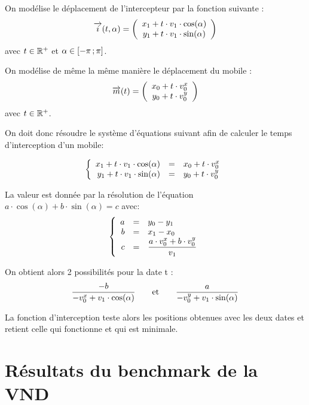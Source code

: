 	On modélise le déplacement de l'intercepteur par la fonction suivante : 
	\[
	\overrightarrow{i}(t,\alpha) = 
	\left(
	\begin{array}{c}
	 x_1 + t \cdot v_1 \cdot \cos(\alpha)\\
	 y_1 + t \cdot v_1 \cdot \sin(\alpha)
	\end{array}
	\right)
	\]
	avec $t \in \mathbb{R}^+$ et $\alpha \in \mathopen{[}-\pi\mathclose{}\mathpunct{};\pi\mathclose{]}$.

	On modélise de même la même manière le déplacement du mobile :
	\[
	\overrightarrow{m}(t) = 
	\left(
	\begin{array}{c}
	 x_0 + t \cdot v^{x}_0\\
	 y_0 + t \cdot v^{y}_0
	\end{array}
	\right)
	\]
	avec $t \in \mathbb{R}^+$.

	On doit donc résoudre le système d'équations suivant afin de calculer le temps d'interception d'un mobile:

	\[
	\left\{
	\begin{array}{r c l}
	x_1 + t \cdot v_1 \cdot \cos(\alpha) &=& x_0 + t \cdot v^{x}_0\\
	y_1 + t \cdot v_1 \cdot \sin(\alpha) &=& y_0 + t \cdot v^{y}_0
	\end{array}
	\right.
	\]

	La valeur est donnée par la résolution de l'équation $a \cdot \cos(\alpha)+b \cdot \sin(\alpha) = c$ avec:
	\[
	\left\{
	\begin{array}{r c l}
	a &=& y_0 - y_1\\
	b &=& x_1 - x_0\\
	c &=& \displaystyle \frac{a \cdot v^{x}_0 +b \cdot v^{y}_0}{v_1}
	\end{array}
	\right.
	\]

	On obtient alors 2 possibilités pour la date t : 
	\[ \frac{-b}{-v^{x}_0 + v_1 \cdot \cos(\alpha)}  \qquad\text{et}\qquad \frac{a}{-v^{y}_0 + v_1 \cdot \sin(\alpha)} \]

	La fonction d'interception teste alors les positions obtenues avec les deux dates et retient celle qui fonctionne et qui est minimale.\cite{projet-zz1}
	
\chapter{Résultats du benchmark de la VND}


